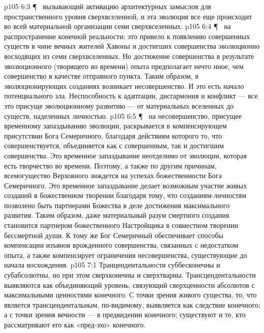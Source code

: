 \vs p105 6:3 \P\ \bibnobreakspace {} вызывающий активацию архитектурных замыслов для пространственного уровня сверхвселенной, и эта эволюция все еще происходит во всей материальной организации семи сверхвселенных.
\vs p105 6:4 \P\ \bibnobreakspace {} на распространение конечной реальности; это привело к появлению совершенных существ в чине вечных жителей Хавоны и достигших совершенства эволюционно восходящих из семи сверхвселенных. Но достижение совершенства в результате эволюционного (творящего во времени) опыта предполагает нечто иное, чем совершенство в качестве отправного пункта. Таким образом, в эволюционирующих созданиях возникает несовершенство. И это есть начало потенциального зла. Неспособность к адаптации, дисгармония и конфликт --- все это присуще эволюционному развитию --- от материальных вселенных до существ, наделенных личностью.
\vs p105 6:5 \P\ \bibnobreakspace {} на несовершенство, присущее временному запаздыванию эволюции, раскрывается в компенсирующем присутствии Бога Семеричного, благодаря действиям которого то, что совершенствуется, объединяется как с совершенным, так и достигшим совершенства. Это временное запаздывание неотделимо от эволюции, которая есть творчество во времени. Поэтому, а также по другим причинам, всемогущество Верховного зиждется на успехах божественности Бога Семеричного. Это временное запаздывание делает возможным участие живых созданий в божественном творении благодаря тому, что созданиям\hyp{}личностям позволено быть партнерами Божества в деле достижения максимального развития. Таким образом, даже материальный разум смертного создания становится партнером божественного Настройщика в совместном творении бессмертной души. К тому же Бог Семеричный обеспечивает способы компенсации изъянов врожденного совершенства, связанных с недостатком опыта, а также компенсирует ограничения несовершенства, существующие до начала восхождения.
\vs p105 7:1 Транцендентальности суббесконечны и субабсолютны, но при этом сверхконечны и сверхтварны. Трансцендентальности выявляются как объединяющий уровень, связующий сверхценности абсолютов с максимальными ценностями конечного. С точки зрения живого существа, то, что является трансцендентальным, по\hyp{}видимому, выявляется как следствие конечного; а с точки зрения вечности --- в предвидении конечного; существуют и те, кто рассматривают его как «пред\hyp{}эхо» конечного.
